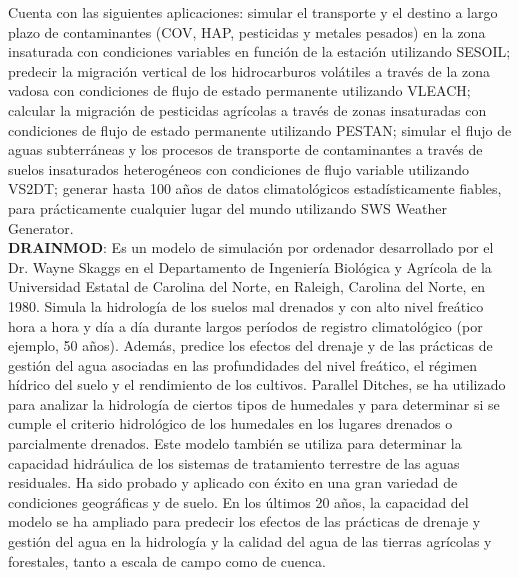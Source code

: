 Cuenta con las siguientes aplicaciones: simular el transporte y el destino a largo plazo de contaminantes (COV, HAP, pesticidas y metales pesados) en la zona insaturada con condiciones variables en función de la estación utilizando SESOIL; predecir la migración vertical de los hidrocarburos volátiles a través de la zona vadosa con condiciones de flujo de estado permanente utilizando VLEACH; calcular la migración de pesticidas agrícolas a través de zonas insaturadas con condiciones de flujo de estado permanente utilizando PESTAN; simular el flujo de aguas subterráneas y los procesos de transporte de contaminantes a través de suelos insaturados heterogéneos con condiciones de flujo variable utilizando VS2DT; generar hasta 100 años de datos climatológicos estadísticamente fiables, para prácticamente cualquier lugar del mundo utilizando SWS Weather Generator. \parencite{noauthor_unsat_nodate}\\

\textbf{DRAINMOD}: Es un modelo de simulación por ordenador desarrollado por el Dr. Wayne Skaggs en el Departamento de Ingeniería Biológica y Agrícola de la Universidad Estatal de Carolina del Norte, en Raleigh, Carolina del Norte, en 1980. Simula la hidrología de los suelos mal drenados y con alto nivel freático hora a hora y día a día durante largos períodos de registro climatológico (por ejemplo, 50 años). Además, predice los efectos del drenaje y de las prácticas de gestión del agua asociadas en las profundidades del nivel freático, el régimen hídrico del suelo y el rendimiento de los cultivos. Parallel Ditches, se ha utilizado para analizar la hidrología de ciertos tipos de humedales y para determinar si se cumple el criterio hidrológico de los humedales en los lugares drenados o parcialmente drenados. Este modelo también se utiliza para determinar la capacidad hidráulica de los sistemas de tratamiento terrestre de las aguas residuales. Ha sido probado y aplicado con éxito en una gran variedad de condiciones geográficas y de suelo. En los últimos 20 años, la capacidad del modelo se ha ampliado para predecir los efectos de las prácticas de drenaje y gestión del agua en la hidrología y la calidad del agua de las tierras agrícolas y forestales, tanto a escala de campo como de cuenca.

